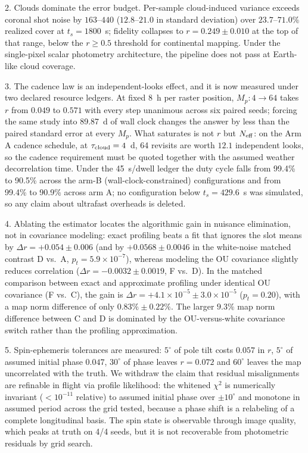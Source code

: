 \documentclass[twocolumn,10pt]{article}
\begin{document}
2. Clouds dominate the error budget. Per-sample cloud-induced variance
exceeds coronal shot noise by $163$--$440$ ($12.8$--$21.0$ in standard
deviation) over $23.7$--$71.0\%$ realized cover at $t_s=1800$~s; fidelity
collapses to $r=0.249\pm0.010$ at the top of that range, below the $r\ge0.5$ threshold
for continental mapping. Under the single-pixel scalar photometry architecture,
the pipeline does not pass at Earth-like cloud coverage.

3. The cadence law is an independent-looks effect, and it is now measured
under two declared resource ledgers. At fixed 8~h per raster position,
$M_p:4\to64$ takes $r$ from $0.049$ to $0.571$ with every step unanimous across
six paired seeds; forcing the same study into 89.87~d of wall clock changes the
answer by less than the paired standard error at every $M_p$. What saturates is
not $r$ but $N_{\rm eff}$: on the Arm A cadence schedule, at $\tau_{\rm cloud}=4$~d,
64 revisits are worth $12.1$ independent looks, so the cadence requirement must be
quoted together with the assumed weather decorrelation time. Under the 45~s/dwell ledger
the duty cycle falls from 99.4\% to 90.5\% across the arm-B (wall-clock-constrained)
configurations and from 99.4\% to 90.9\% across arm A; no configuration below
$t_s=429.6$~s was simulated, so any claim about ultrafast overheads is
deleted.

4. Ablating the estimator locates the algorithmic gain in nuisance elimination,
not in covariance modeling: exact profiling beats a fit that ignores the slot means
by $\Delta r=+0.054\pm0.006$ (and by $+0.0568\pm0.0046$ in the white-noise matched
contrast D vs.\ A, $p_t=5.9\times10^{-7}$), whereas modeling the OU covariance slightly
reduces correlation ($\Delta r=-0.0032\pm0.0019$, F vs.\ D). In the matched comparison
between exact and approximate profiling under identical OU covariance (F vs.\ C), the gain
is $\Delta r=+4.1\times10^{-5}\pm3.0\times10^{-5}$ ($p_t=0.20$), with a map norm difference
of only $0.83\%\pm0.22\%$. The larger $9.3\%$ map norm difference between C and D is dominated
by the OU-versus-white covariance switch rather than the profiling approximation.

5. Spin-ephemeris tolerances are measured: $5^\circ$ of pole tilt costs
$0.057$ in $r$, $5^\circ$ of assumed initial phase $0.047$, $30^\circ$ of phase
leaves $r=0.072$ and $60^\circ$ leaves the map uncorrelated with the truth. We
withdraw the claim that residual misalignments are refinable in flight via
profile likelihood: the whitened $\chi^2$ is numerically invariant ($<10^{-11}$
relative) to assumed initial phase over $\pm10^\circ$ and monotone in assumed
period across the grid tested, because a phase shift is a relabeling of a
complete longitudinal basis. The spin state is observable through image quality,
which peaks at truth on 4/4 seeds, but it is not recoverable from photometric
residuals by grid search.
\end{document}
